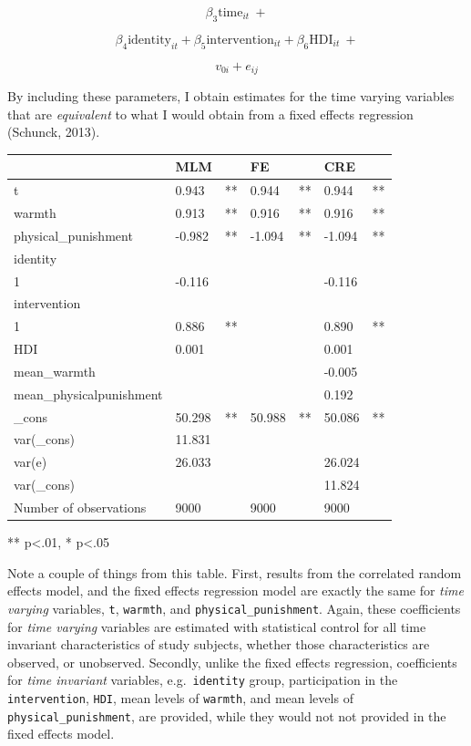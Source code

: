 \documentclass[
  letterpaper,
  DIV=11,
  numbers=noendperiod]{scrreprt}
\begin{document}
\[\beta_3 \text{time}_{it} \ + \]

\[\beta_4 \text{identity}_{it} + \beta_5 \text{intervention}_{it} + \beta_6 \text{HDI}_{it} \ +\]

\[v_{0i} + e_{ij}\]

By including these parameters, I obtain estimates for the time varying
variables that are \emph{equivalent} to what I would obtain from a fixed
effects regression (Schunck, 2013).

\begin{longtable}[]{@{}lllllll@{}}
\toprule\noalign{}
& MLM & & FE & & CRE & \\
\midrule\noalign{}
\endhead
\bottomrule\noalign{}
\endlastfoot
t & 0.943 & ** & 0.944 & ** & 0.944 & ** \\
warmth & 0.913 & ** & 0.916 & ** & 0.916 & ** \\
physical\_punishment & -0.982 & ** & -1.094 & ** & -1.094 & ** \\
identity & & & & & & \\
1 & -0.116 & & & & -0.116 & \\
intervention & & & & & & \\
1 & 0.886 & ** & & & 0.890 & ** \\
HDI & 0.001 & & & & 0.001 & \\
mean\_warmth & & & & & -0.005 & \\
mean\_physicalpunishment & & & & & 0.192 & \\
\_cons & 50.298 & ** & 50.988 & ** & 50.086 & ** \\
var(\_cons) & 11.831 & & & & & \\
var(e) & 26.033 & & & & 26.024 & \\
var(\_cons) & & & & & 11.824 & \\
Number of observations & 9000 & & 9000 & & 9000 & \\
\end{longtable}

** p\textless.01, * p\textless.05

Note a couple of things from this table. First, results from the
correlated random effects model, and the fixed effects regression model
are exactly the same for \emph{time varying} variables, \texttt{t},
\texttt{warmth}, and \texttt{physical\_punishment}. Again, these
coefficients for \emph{time varying} variables are estimated with
statistical control for all time invariant characteristics of study
subjects, whether those characteristics are observed, or unobserved.
Secondly, unlike the fixed effects regression, coefficients for
\emph{time invariant} variables, e.g.~\texttt{identity} group,
participation in the \texttt{intervention}, \texttt{HDI}, mean levels of
\texttt{warmth}, and mean levels of \texttt{physical\_punishment}, are
provided, while they would not not provided in the fixed effects model.
\end{document}
